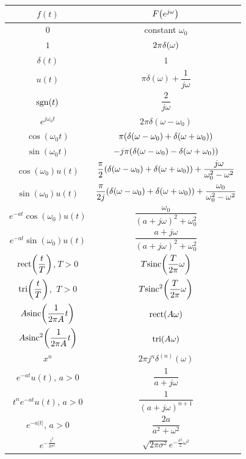 \documentclass[11pt]{article}
\begin{document}
  \bgroup
  \renewcommand{\arraystretch}{1.8}
  \setlength{\tabcolsep}{1.7cm}
  \normalsize\begin{tabular}{c|c}
    \(f(t)\) & \(F{\left( e^{j\omega} \right)}\) \\
    \toprule
    \(0\) & constant \(\omega_0\) \\
    \(1\) & \(2\pi\delta{\left( \omega \right)}\) \\
    \(\delta(t)\) & \(1\) \\
    \(u(t)\) & \(\pi\delta(\omega) + \dfrac{1}{j\omega}\) \\
    \(\mathrm{sgn}(t)\) & \(\dfrac{2}{j\omega}\) \\
    \(e^{j\omega_0t}\) & \(2\pi\delta(\omega - \omega_0)\) \\
    \(\cos(\omega_0t)\) & \(\pi{\left( \delta(\omega - \omega_0) + \delta(\omega + \omega_0) \right)}\) \\
    \(\sin(\omega_0t)\) & \(-j\pi{\left( \delta(\omega - \omega_0) - \delta(\omega + \omega_0) \right)}\) \\
    \(\cos(\omega_0)u(t)\) & \(\dfrac{\pi}{2}{\left( \delta(\omega - \omega_0) + \delta(\omega + \omega_0) \right)} +
    \dfrac{j\omega}{\omega_0^2 -  \omega^2}\) \\
    \(\sin(\omega_0)u(t)\) & \(\dfrac{\pi}{2j}{\left( \delta(\omega - \omega_0) + \delta(\omega + \omega_0) \right)} +
    \dfrac{\omega_0}{\omega_0^2 -  \omega^2}\) \\
    \(e^{-at}\cos(\omega_0)u(t)\) & \(\dfrac{\omega_0}{(a + j\omega)^2 + \omega_0^2}\) \\
    \(e^{-at}\sin(\omega_0)u(t)\) & \(\dfrac{a + j\omega}{(a + j\omega)^2 + \omega_0^2}\) \\
    \(\mathrm{rect}{\left( \dfrac{t}{T} \right)}\),\(\ T > 0\) & \(T\mathrm{sinc}{\left( \dfrac{T}{2\pi}\omega \right)}\) \\
    \(\mathrm{tri}{\left( \dfrac{t}{T} \right)}\), \(\ T > 0\) & \(T\mathrm{sinc}^2{\left( \dfrac{T}{2\pi}\omega \right)}\) \\
    \(A\mathrm{sinc}{\left( \dfrac{1}{2\pi A}t \right)}\) & \(\mathrm{rect}{\left( A\omega \right)}\) \\
    \(A\mathrm{sinc}^2{\left( \dfrac{1}{2\pi A}t \right)}\) & \(\mathrm{tri}{\left( A\omega \right)}\) \\
    \(x^n\) & \(2\pi j^n \delta^{(n)}(\omega)\) \\
    \(e^{-at}u(t)\), \(a > 0\) & \(\dfrac{1}{a + j\omega}\) \\
    \(t^ne^{-at}u(t)\), \(a > 0\) & \(\dfrac{1}{(a + j\omega)^{n + 1}}\) \\
    \(e^{-a|t|}\), \(a > 0\) & \(\dfrac{2a}{a^2 + \omega^2}\) \\
    \(e^{-\frac{t^2}{2\sigma^2}}\) & \(\sqrt{2\pi\sigma^2} e^{-\frac{\sigma^2}{2}\omega^2}\) \\
  \end{tabular}
  \egroup
\end{document}
